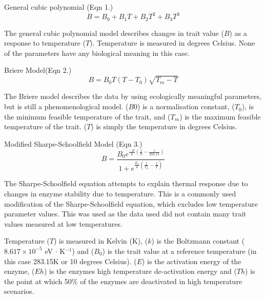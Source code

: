 \documentclass[11pt]{article}
\begin{document}
General cubic polynomial (Eqn 1.)
\begin{equation}
    B = B_0 + B_1 T + B_2 T^2 + B_3 T^3
\end{equation}

The general cubic polynomial model describes changes in trait value ($B$) as a response to temperature ($T$). Temperature is measured in degrees Celsius. None of the parameters have any biological meaning in this case. 

Briere Model(Eqn 2.)
\begin{equation}
    B = B_0 T (T-T_0) \sqrt{T_m-T}
\end{equation}

The Briere model describes the data by using ecologically meaningful parameters, but is still a phenomenological model. ($B0$) is a normalisation constant, ($T_0$), is the minimum feasible temperature of the trait, and ($T_m$) is the maximum feasible temperature of the trait. ($T$) is simply the temperature in degrees Celsius.  

Modified Sharpe-Schoolfield Model
(Eqn 3.)
\begin{equation}
     B = \frac{B_0 e^{\frac{-E}{k} (\frac{1}{T} - \frac{1}{283.15})}} { 1 + e^{\frac{E_h}{k} (\frac{1}{T_h} - \frac{1}{T})}}
\end{equation} 

The Sharpe-Schoolfield equation attempts to explain thermal response due to changes in enzyme stability due to temperature. This is a commonly used modification of the Sharpe-Schoolfield equation, which excludes low temperature parameter values. This was used as the data used did not contain many trait values measured at low temperatures\citep{Schoolfield1981}. 

Temperature ($T$) is measured in Kelvin (K), ($k$) is the Boltzmann constant ($8.617 \times 10^{-5}$ eV $\cdot$ K$^{-1}$) and ($B_0$) is the trait value at a reference temperature (in this case 283.15K or 10 degrees Celsius). ($E$) is the activation energy of the enzyme, ($Eh$) is the enzymes high temperature de-activation energy and ($Th$) is the point at which 50\% of the enzymes are deactivated in high temperature scenarios.
 
\end{document}
